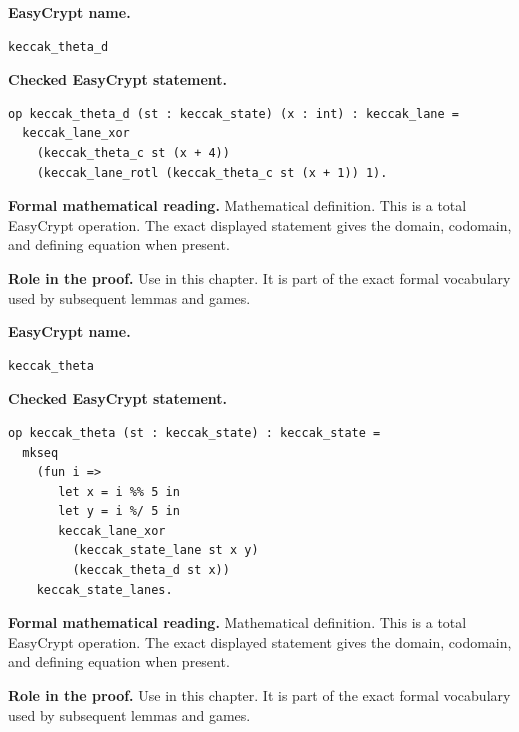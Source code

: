 \begin{formaldefinition}
\noindent\textbf{EasyCrypt name.}
\begin{lstlisting}[language=EasyCrypt,basicstyle=\ttfamily\scriptsize]
keccak_theta_d
\end{lstlisting}
\noindent\textbf{Checked EasyCrypt statement.}
\begin{lstlisting}[language=EasyCrypt,basicstyle=\ttfamily\scriptsize]
op keccak_theta_d (st : keccak_state) (x : int) : keccak_lane =
  keccak_lane_xor
    (keccak_theta_c st (x + 4))
    (keccak_lane_rotl (keccak_theta_c st (x + 1)) 1).
\end{lstlisting}
\noindent\textbf{Formal mathematical reading.}
Mathematical definition. This is a total EasyCrypt operation.  The exact displayed statement gives the domain, codomain, and defining equation when present.

\noindent\textbf{Role in the proof.}
Use in this chapter. It is part of the exact formal vocabulary used by subsequent lemmas and games.

\end{formaldefinition}

\begin{formaldefinition}
\noindent\textbf{EasyCrypt name.}
\begin{lstlisting}[language=EasyCrypt,basicstyle=\ttfamily\scriptsize]
keccak_theta
\end{lstlisting}
\noindent\textbf{Checked EasyCrypt statement.}
\begin{lstlisting}[language=EasyCrypt,basicstyle=\ttfamily\scriptsize]
op keccak_theta (st : keccak_state) : keccak_state =
  mkseq
    (fun i =>
       let x = i %% 5 in
       let y = i %/ 5 in
       keccak_lane_xor
         (keccak_state_lane st x y)
         (keccak_theta_d st x))
    keccak_state_lanes.
\end{lstlisting}
\noindent\textbf{Formal mathematical reading.}
Mathematical definition. This is a total EasyCrypt operation.  The exact displayed statement gives the domain, codomain, and defining equation when present.

\noindent\textbf{Role in the proof.}
Use in this chapter. It is part of the exact formal vocabulary used by subsequent lemmas and games.

\end{formaldefinition}

